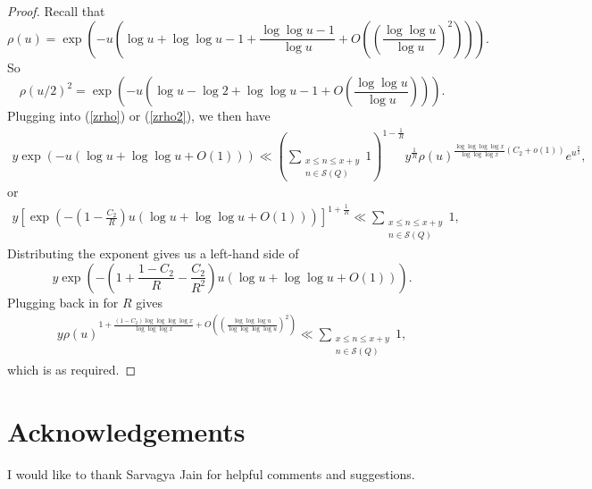\documentclass{amsart}
\begin{document}
\begin{proof}
Recall that
$$\rho(u)=\exp\left(-u\left(\log u+\log\log u-1+\frac{\log\log u-1}{\log u}+O\left(\left(\frac{\log\log u}{\log u}\right)^2\right)\right)\right).$$
So
$$\rho(u/2)^2=\exp\left(-u\left(\log u-\log 2+\log\log u-1+O\left(\frac{\log\log u}{\log u}\right)\right)\right).$$
Plugging into (\ref{zrho}) or (\ref{zrho2}), we then have
\begin{align*}
y\exp\left(-u\left(\log u+\log\log u+O(1)\right)\right)\ll \left(\sum_{\substack{x\leq n\leq x+y \\ n\in \mathcal S(Q) }}1\right)^{1-\frac 1R}y^\frac 1R\rho(u)^{\frac{\log\log\log\log x}{\log\log\log x}\left(C_2+o(1)\right)}e^{u^\frac 23},
\end{align*}
or
\begin{align*}
y\left[\exp\left(-\left(1-\frac{C_2}{R}\right)u\left(\log u+\log\log u+O(1)\right)\right)\right]^{1+\frac{1}{R}}\ll \sum_{\substack{x\leq n\leq x+y \\ n\in \mathcal S(Q) }}1,
\end{align*}
Distributing the exponent gives us a left-hand side of
$$y\exp\left(-\left(1+\frac{1-C_2}{R}-\frac{C_2}{R^2}\right)u\left(\log u+\log\log u+O(1)\right)\right).$$
Plugging back in for $R$ gives
\begin{align*}
y\rho(u)^{1+\frac{(1-C_2)\log\log\log \log x}{\log\log\log x}+O\left(\left(\frac{\log\log \log u}{\log \log \log \log u}\right)^2\right)}\ll \sum_{\substack{x\leq n\leq x+y \\ n\in \mathcal S(Q) }}1,
\end{align*}
which is as required.
\end{proof}
\section{Acknowledgements}

I would like to thank Sarvagya Jain for helpful comments and suggestions.
\end{document}
